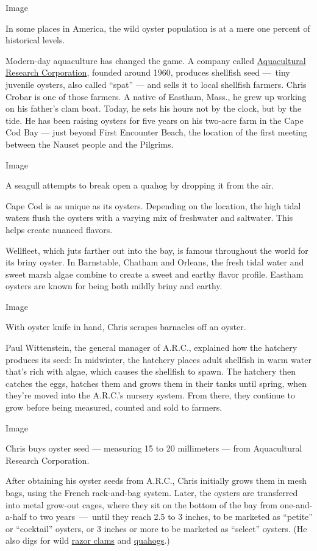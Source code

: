 Image

In some places in America, the wild oyster population is at a mere one
percent of historical levels.

Modern-day aquaculture has changed the game. A company called
\href{https://www.archatchery.com/}{Aquacultural Research Corporation},
founded around 1960, produces shellfish seed ---~tiny juvenile oysters,
also called ``spat'' --- and sells it to local shellfish farmers. Chris
Crobar is one of those farmers. A native of Eastham, Mass., he grew up
working on his father's clam boat. Today, he sets his hours not by the
clock, but by the tide. He has been raising oysters for five years on
his two-acre farm in the Cape Cod Bay --- just beyond First Encounter
Beach, the location of the first meeting between the Nauset people and
the Pilgrims.

Image

A seagull attempts to break open a quahog by dropping it from the air.

Cape Cod is as unique as its oysters. Depending on the location, the
high tidal waters flush the oysters with a varying mix of freshwater and
saltwater. This helps create nuanced flavors.

Wellfleet, which juts farther out into the bay, is famous throughout the
world for its briny oyster. In Barnstable, Chatham and Orleans, the
fresh tidal water and sweet marsh algae combine to create a sweet and
earthy flavor profile. Eastham oysters are known for being both mildly
briny and earthy.

Image

With oyster knife in hand, Chris scrapes barnacles off an oyster.

Paul Wittenstein, the general manager of A.R.C., explained how the
hatchery produces its seed: In midwinter, the hatchery places adult
shellfish in warm water that's rich with algae, which causes the
shellfish to spawn. The hatchery then catches the eggs, hatches them and
grows them in their tanks until spring, when they're moved into the
A.R.C.'s nursery system. From there, they continue to grow before being
measured, counted and sold to farmers.

Image

Chris buys oyster seed --- measuring 15 to 20 millimeters --- from
Aquacultural Research Corporation.

After obtaining his oyster seeds from A.R.C., Chris initially grows them
in mesh bags, using the French rack-and-bag system. Later, the oysters
are transferred into metal grow-out cages, where they sit on the bottom
of the bay from one-and-a-half to two years~---~until they reach 2.5 to
3 inches, to be marketed as ``petite'' or ``cocktail'' oysters, or 3
inches or more to be marketed as ``select'' oysters. (He also digs for
wild
\href{http://www.edc.uri.edu/restoration/html/gallery/invert/razor.htm}{razor
clams} and
\href{https://www.edc.uri.edu/restoration/html/gallery/invert/quahog.htm}{quahogs}.)

